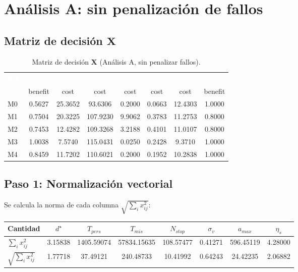 \documentclass[12pt,a4paper,oneside]{book}
\begin{document}
\section{Análisis A: sin penalización de fallos}

\subsection{Matriz de decisión $\mathbf{X}$}

\begin{table}[H]
\centering
\caption{Matriz de decisión $\mathbf{X}$ (Análisis A, sin penalizar fallos).}
\renewcommand{\arraystretch}{1.3}
\small
\begin{tabular}{lccccccc}
\toprule
\rowcolor{primary}
\textcolor{white}{\textbf{Alt.}} &
\textcolor{white}{$d^\star$} &
\textcolor{white}{$T_{pers}$} &
\textcolor{white}{$T_{mis}$} &
\textcolor{white}{$N_{stop}$} &
\textcolor{white}{$\sigma_v$} &
\textcolor{white}{$a_{max}$} &
\textcolor{white}{$\eta_s$} \\
\rowcolor{secondary}
& benefit & cost & cost & cost & cost & cost & benefit \\
\midrule
M0 & 0.5627 & 25.3652 & 93.6306 & 0.2000 & 0.0663 & 12.4303 & 1.0000 \\
M1 & 0.7504 & 20.3225 & 107.9230 & 9.9062 & 0.3783 & 11.2753 & 0.8000 \\
M2 & 0.7453 & 12.4282 & 109.3268 & 3.2188 & 0.4101 & 11.0107 & 0.8000 \\
M3 & 1.0038 & 7.5740 & 115.0431 & 0.0250 & 0.2428 & 9.3710 & 1.0000 \\
M4 & 0.8459 & 11.7202 & 110.6021 & 0.2000 & 0.1952 & 10.2838 & 1.0000 \\
\bottomrule
\end{tabular}
\end{table}

\subsection{Paso 1: Normalización vectorial}

Se calcula la norma de cada columna $\sqrt{\sum_i x_{ij}^2}$:

\begin{table}[H]
\centering
\renewcommand{\arraystretch}{1.3}
\small
\begin{tabular}{lccccccc}
\toprule
\textbf{Cantidad} & $d^\star$ & $T_{pers}$ & $T_{mis}$ & $N_{stop}$ & $\sigma_v$ & $a_{max}$ & $\eta_s$ \\
\midrule
$\sum_i x_{ij}^2$ & 3.15838 & 1405.59074 & 57834.15635 & 108.57477 & 0.41271 & 596.45119 & 4.28000 \\
$\sqrt{\sum_i x_{ij}^2}$ & 1.77718 & 37.49121 & 240.48733 & 10.41992 & 0.64243 & 24.42235 & 2.06882 \\
\bottomrule
\end{tabular}
\end{table}
\end{document}
